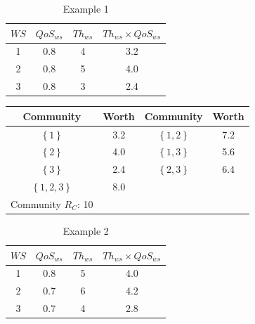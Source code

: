 \begin{table}[!t]
\renewcommand{\arraystretch}{1.3}
\caption{Example 1}
\label{example_1}
\centering
\begin{tabular}{c c c c}
\hline
$WS$ & $QoS_{ws}$ & $Th_{ws}$ & $Th_{ws} \times QoS_{ws}$\\
\hline
1 & 0.8 & 4 & 3.2\\
2 & 0.8 & 5 & 4.0\\
3 & 0.8 & 3 & 2.4\\
\hline
\end{tabular}
\end{table}

\begin{table}[!t]
\renewcommand{\arraystretch}{1.3}
\label{example_1_2}
\centering
\begin{tabular}{c c || c c}
\hline
Community & Worth & Community & Worth\\
\hline
$\left\{1\right\}$ & 3.2 & $\left\{1,2\right\}$ & 7.2\\
$\left\{2\right\}$ & 4.0 & $\left\{1,3\right\}$ & 5.6\\
$\left\{3\right\}$ & 2.4 & $\left\{2,3\right\}$ & 6.4\\
$\left\{1,2,3\right\}$ & 8.0\\
\hline
Community $R_C$: 10\\
\hline
\end{tabular}
\end{table}

\begin{table}[!t]
\renewcommand{\arraystretch}{1.3}
\caption{Example 2}
\label{example_2}
\centering
\begin{tabular}{c c c c}
\hline
$WS$ & $QoS_{ws}$ & $Th_{ws}$ & $Th_{ws} \times QoS_{ws}$\\
\hline
1 & 0.8 & 5 & 4.0\\
2 & 0.7 & 6 & 4.2\\
3 & 0.7 & 4 & 2.8\\
\hline
\end{tabular}
\end{table}


